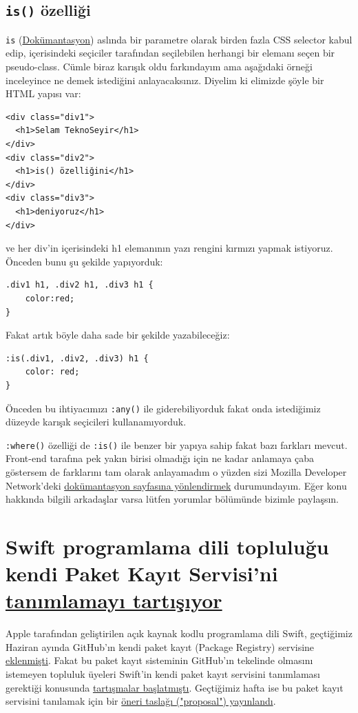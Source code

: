 \documentclass[11pt]{article}
\begin{document}
\subsection{\texttt{is()} özelliği}
\label{sec:org68fe7c4}
\texttt{is} (\href{https://developer.mozilla.org/en-US/docs/Web/CSS/:is}{Dokümantasyon}) aslında bir parametre olarak birden fazla CSS selector
kabul edip, içerisindeki seçiciler tarafından seçilebilen herhangi bir
elemanı seçen bir pseudo-class. Cümle biraz karışık oldu farkındayım ama
aşağıdaki örneği inceleyince ne demek istediğini anlayacaksınız. Diyelim ki
elimizde şöyle bir HTML yapısı var:
\begin{verbatim}
<div class="div1">
  <h1>Selam TeknoSeyir</h1>
</div>
<div class="div2">
  <h1>is() özelliğini</h1>
</div>
<div class="div3">
  <h1>deniyoruz</h1>
</div>
\end{verbatim}
ve her div'in içerisindeki h1 elemanının yazı rengini kırmızı yapmak
istiyoruz. Önceden bunu şu şekilde yapıyorduk:
\begin{verbatim}
.div1 h1, .div2 h1, .div3 h1 {
    color:red;
}
\end{verbatim}
Fakat artık böyle daha sade bir şekilde yazabileceğiz:
\begin{verbatim}
:is(.div1, .div2, .div3) h1 {
    color: red;
}
\end{verbatim}
Önceden bu ihtiyacımızı \texttt{:any()} ile giderebiliyorduk fakat onda istediğimiz
düzeyde karışık seçicileri kullanamıyorduk.

\texttt{:where()} özelliği de \texttt{:is()} ile benzer bir yapıya sahip fakat bazı farkları
mevcut. Front-end tarafına pek yakın birisi olmadığı için ne kadar anlamaya
çaba göstersem de farklarını tam olarak anlayamadım o yüzden sizi Mozilla
Developer Network'deki \href{https://developer.mozilla.org/en-US/docs/Web/CSS/:where}{dokümantasyon sayfasına yönlendirmek} durumundayım. Eğer
konu hakkında bilgili arkadaşlar varsa lütfen yorumlar bölümünde bizimle
paylaşsın.
\section{Swift programlama dili topluluğu kendi Paket Kayıt Servisi'ni \href{https://forums.swift.org/t/swift-package-registry-service/37219}{tanımlamayı tartışıyor}}
\label{sec:org903b23e}
Apple tarafından geliştirilen açık kaynak kodlu programlama dili Swift,
geçtiğimiz Haziran ayında GitHub'ın kendi paket kayıt (Package Registry)
servisine \href{https://github.blog/2019-06-03-github-package-registry-will-support-swift-packages/}{eklenmişti}. Fakat bu paket kayıt sisteminin GitHub'ın tekelinde
olmasını istemeyen topluluk üyeleri Swift'in kendi paket kayıt servisini
tanımlaması gerektiği konusunda \href{https://forums.swift.org/t/github-swift-package-management-service/30406}{tartışmalar başlatmıştı}. Geçtiğimiz hafta ise
bu paket kayıt servisini tanılamak için bir \href{https://forums.swift.org/t/swift-package-registry-service/37219}{öneri taslağı ("proposal")
yayınlandı}.
\end{document}
